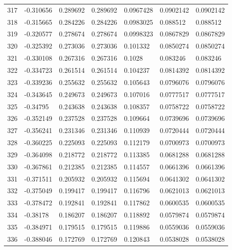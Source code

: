 \begin{longtable}{l|lll|lll}
 317 & -0.310656    & 0.289692    & 0.289692    &  0.0967428   & 0.0902142   & 0.0902142   \\
 318 & -0.315665    & 0.284226    & 0.284226    &  0.0983025   & 0.088512    & 0.088512    \\
 319 & -0.320577    & 0.278674    & 0.278674    &  0.0998323   & 0.0867829   & 0.0867829   \\
 320 & -0.325392    & 0.273036    & 0.273036    &  0.101332    & 0.0850274   & 0.0850274   \\
 321 & -0.330108    & 0.267316    & 0.267316    &  0.1028      & 0.083246    & 0.083246    \\
 322 & -0.334723    & 0.261514    & 0.261514    &  0.104237    & 0.0814392   & 0.0814392   \\
 323 & -0.339236    & 0.255632    & 0.255632    &  0.105643    & 0.0796076   & 0.0796076   \\
 324 & -0.343645    & 0.249673    & 0.249673    &  0.107016    & 0.0777517   & 0.0777517   \\
 325 & -0.34795     & 0.243638    & 0.243638    &  0.108357    & 0.0758722   & 0.0758722   \\
 326 & -0.352149    & 0.237528    & 0.237528    &  0.109664    & 0.0739696   & 0.0739696   \\
 327 & -0.356241    & 0.231346    & 0.231346    &  0.110939    & 0.0720444   & 0.0720444   \\
 328 & -0.360225    & 0.225093    & 0.225093    &  0.112179    & 0.0700973   & 0.0700973   \\
 329 & -0.364098    & 0.218772    & 0.218772    &  0.113385    & 0.0681288   & 0.0681288   \\
 330 & -0.367861    & 0.212385    & 0.212385    &  0.114557    & 0.0661396   & 0.0661396   \\
 331 & -0.371511    & 0.205932    & 0.205932    &  0.115694    & 0.0641302   & 0.0641302   \\
 332 & -0.375049    & 0.199417    & 0.199417    &  0.116796    & 0.0621013   & 0.0621013   \\
 333 & -0.378472    & 0.192841    & 0.192841    &  0.117862    & 0.0600535   & 0.0600535   \\
 334 & -0.38178     & 0.186207    & 0.186207    &  0.118892    & 0.0579874   & 0.0579874   \\
 335 & -0.384971    & 0.179515    & 0.179515    &  0.119886    & 0.0559036   & 0.0559036   \\
 336 & -0.388046    & 0.172769    & 0.172769    &  0.120843    & 0.0538028   & 0.0538028   \\

\end{longtable}
